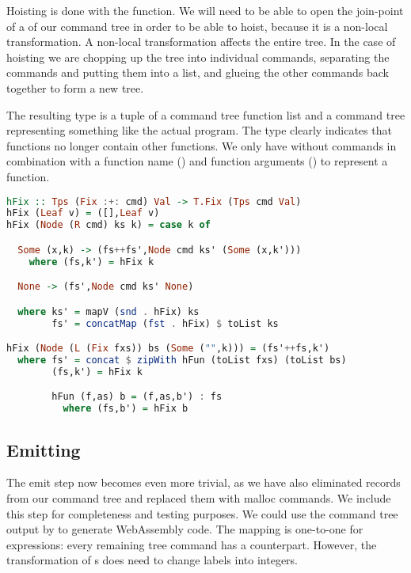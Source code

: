 Hoisting is done with the  function. We will need to be able to open the join-point of a  of our command tree in order to be able to hoist, because it is a non-local transformation. A non-local transformation affects the entire tree. In the case of hoisting we are chopping up the tree into individual commands, separating the  commands and putting them into a list, and glueing the other commands back together to form a new tree.

The resulting type is a tuple of a command tree function list and a command tree representing something like the actual program. The type clearly indicates that functions no longer contain other functions. We only have  without  commands in combination with a function name () and function arguments (\icode{[Var]}) to represent a function.

\begin{lstlisting}[language=Haskell]
hFix :: Tps (Fix :+: cmd) Val -> T.Fix (Tps cmd Val)
hFix (Leaf v) = ([],Leaf v)
hFix (Node (R cmd) ks k) = case k of

  Some (x,k) -> (fs++fs',Node cmd ks' (Some (x,k')))
    where (fs,k') = hFix k

  None -> (fs',Node cmd ks' None)

  where ks' = mapV (snd . hFix) ks
        fs' = concatMap (fst . hFix) $ toList ks

hFix (Node (L (Fix fxs)) bs (Some ("",k))) = (fs'++fs,k')
  where fs' = concat $ zipWith hFun (toList fxs) (toList bs)
        (fs,k') = hFix k

        hFun (f,as) b = (f,as,b') : fs
          where (fs,b') = hFix b
\end{lstlisting}

\subsection{\label{subsection:emit2}Emitting}
The emit step now becomes even more trivial, as we have also eliminated records from our command tree and replaced them with malloc commands. We include this step for completeness and testing purposes. We could use the command tree output by  to generate WebAssembly code. The mapping is one-to-one for expressions: every remaining tree command has a  counterpart. However, the transformation of s does need to change labels into integers.

